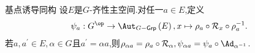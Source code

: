 \begin{proposition}{基点诱导同构}{}
	设$E$是$G$-齐性主空间.对任一$a\in E$,定义
	\begin{align*}
		\psi_{a}:G^{\op}\to\Aut_{G-\mathsf{Grp}}\left(E\right),x\mapsto\rho_{a}\circ\mathcal{R}_{x}\circ\rho_{a}^{-1}.
	\end{align*}
	若$a,a^{\prime}\in E,\alpha\in G$且$a^{\prime}=\alpha a$,则$\rho_{\alpha a}=\rho_{a}\circ\mathcal{R}_{\alpha},\psi_{\alpha a}=\psi_{a}\circ\Ad_{\alpha^{-1}}$.
\end{proposition}





















